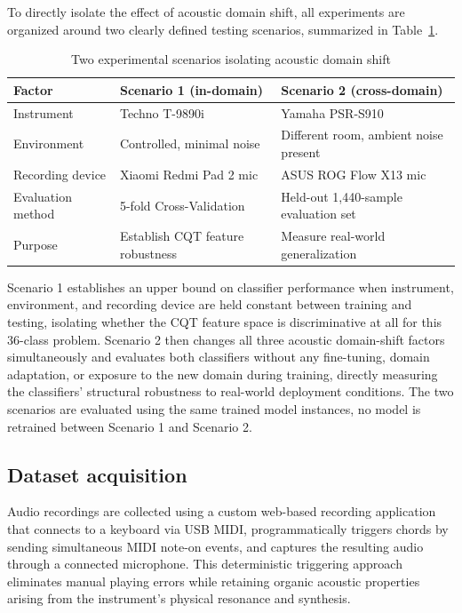 \documentclass[pdflatex,sn-mathphys-num,iicol]{sn-jnl}
\theoremstyle{thmstyleone}
\theoremstyle{thmstyletwo}
\theoremstyle{thmstylethree}
\begin{document}
To directly isolate the effect of acoustic domain shift, all experiments are organized around two clearly defined testing scenarios, summarized in Table~\ref{tab:scenarios}.

\begin{table}[htbp]
\caption{Two experimental scenarios isolating acoustic domain shift}\label{tab:scenarios}
\begin{tabular*}{\textwidth}{@{}lll@{}}
\toprule
Factor & Scenario 1 (in-domain) & Scenario 2 (cross-domain) \\
\midrule
Instrument & Techno T-9890i & Yamaha PSR-S910 \\
Environment & Controlled, minimal noise & Different room, ambient noise present \\
Recording device & Xiaomi Redmi Pad 2 mic & ASUS ROG Flow X13 mic \\
Evaluation method & 5-fold Cross-Validation & Held-out 1,440-sample evaluation set \\
Purpose & Establish CQT feature robustness & Measure real-world generalization \\
\bottomrule
\end{tabular*}
\end{table}

Scenario 1 establishes an upper bound on classifier performance when instrument, environment, and recording device are held constant between training and testing, isolating whether the CQT feature space is discriminative at all for this 36-class problem. Scenario 2 then changes all three acoustic domain-shift factors simultaneously and evaluates both classifiers without any fine-tuning, domain adaptation, or exposure to the new domain during training, directly measuring the classifiers' structural robustness to real-world deployment conditions. The two scenarios are evaluated using the same trained model instances, no model is retrained between Scenario 1 and Scenario 2.

\subsection{Dataset acquisition}\label{subsec3_1}

Audio recordings are collected using a custom web-based recording application that connects to a keyboard via USB MIDI, programmatically triggers chords by sending simultaneous MIDI note-on events, and captures the resulting audio through a connected microphone. This deterministic triggering approach eliminates manual playing errors while retaining organic acoustic properties arising from the instrument's physical resonance and synthesis.
\end{document}
